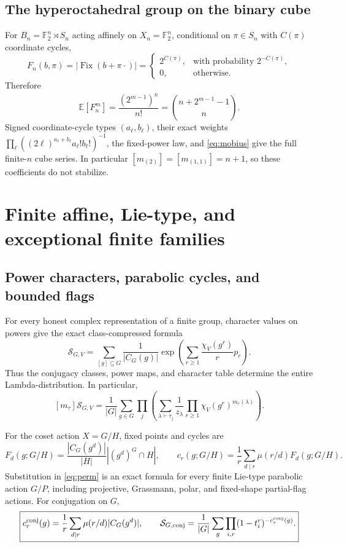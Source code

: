 \documentclass[10pt]{article}
\newcommand{\Fix}{\operatorname{Fix}}
\newcommand{\MGF}{\mathcal S}
\newcommand{\F}{\mathbb F}
\begin{document}
\subsection{The hyperoctahedral group on the binary cube}
For $B_n=\F_2^n\rtimes S_n$ acting affinely on $X_n=\F_2^n$, conditional on
$\pi\in S_n$ with $C(\pi)$ coordinate cycles,
\[
F_n(b,\pi)=|\Fix(b+\pi\cdot)|=
\begin{cases}2^{C(\pi)},&\text{with probability }2^{-C(\pi)},\\0,&\text{otherwise.}\end{cases}
\]
Therefore
\begin{equation}\label{eq:cubemoments}
\boxed{\mathbb E[F_n^m]=\frac{(2^{m-1})^{\overline n}}{n!}
=\binom{n+2^{m-1}-1}{n}.}
\end{equation}
Signed coordinate-cycle types $(a_\ell,b_\ell)$, their exact weights
$\prod_\ell((2\ell)^{a_\ell+b_\ell}a_\ell!b_\ell!)^{-1}$, the fixed-power
law, and \eqref{eq:mobius} give the full finite-$n$ cube series. In particular
$[m_{(2)}]=[m_{(1,1)}]=n+1$, so these coefficients do not stabilize.

\section{Finite affine, Lie-type, and exceptional finite families}

\subsection{Power characters, parabolic cycles, and bounded flags}
For every honest complex representation of a finite group, character values
on powers give the exact class-compressed formula
\begin{equation}\label{eq:power-character}
\boxed{\MGF_{G,V}=\sum_{[g]\subseteq G}\frac1{|C_G(g)|}
\exp\!\left(\sum_{r\ge1}\frac{\chi_V(g^r)}r p_r\right).}
\end{equation}
Thus the conjugacy classes, power maps, and character table determine the
entire Lambda-distribution.  In particular,
\begin{equation}\label{eq:power-coefficient}
\boxed{[m_\tau]\MGF_{G,V}=\frac1{|G|}\sum_{g\in G}\prod_j
\left(\sum_{\lambda\vdash\tau_j}\frac1{z_\lambda}
\prod_{r\ge1}\chi_V(g^r)^{m_r(\lambda)}\right).}
\end{equation}

For the coset action $X=G/H$, fixed points and cycles are
\begin{equation}\label{eq:parabolic-fixed-cycle}
\boxed{F_d(g;G/H)=\frac{|C_G(g^d)|}{|H|}|(g^d)^G\cap H|,\qquad
c_r(g;G/H)=\frac1r\sum_{d\mid r}\mu(r/d)F_d(g;G/H).}
\end{equation}
Substitution in \eqref{eq:perm} is an exact formula for every finite
Lie-type parabolic action $G/P$, including projective, Grassmann, polar, and
fixed-shape partial-flag actions.  For conjugation on $G$,
\begin{equation}\label{eq:finite-conjugation-cycles}
\boxed{c_r^{\rm conj}(g)=\frac1r\sum_{d\mid r}\mu(r/d)|C_G(g^d)|,\qquad
\MGF_{G,\rm conj}=\frac1{|G|}\sum_g\prod_{i,r}
(1-t_i^r)^{-c_r^{\rm conj}(g)}.}
\end{equation}
\end{document}
